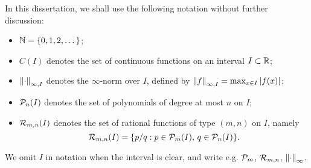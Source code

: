 In this dissertation, we shall use the following notation without further discussion:
\begin{itemize}
    \item $\mathbb{N}=\{0,1,2,\dots\}$;
    \item $C(I)$ denotes the set of continuous functions on an interval $I \subset \mathbb{R}$;
    \item $\left\lVert\cdot\right\rVert_{\infty,I}$ denotes the $\infty$-norm over $I$, defined by $\left\lVert f\right\rVert_{\infty,I}=\max_{x\in I}|f(x)|$;
    \item $\mathcal{P}_n(I)$ denotes the set of polynomials of degree at most $n$ on $I$;
    \item $\mathcal{R}_{m,n}(I)$ denotes the set of rational functions of type $(m,n)$ on $I$, namely
    \[\mathcal{R}_{m,n}(I)= \{p/q : p \in \mathcal{P}_m(I),\, q \in \mathcal{P}_n(I)\}.\]
    
\end{itemize}
We omit $I$ in notation when the interval is clear, and write e.g. $\mathcal{P}_m$, $\mathcal{R}_{m,n}$, $\left\lVert\cdot\right\rVert_\infty$.
